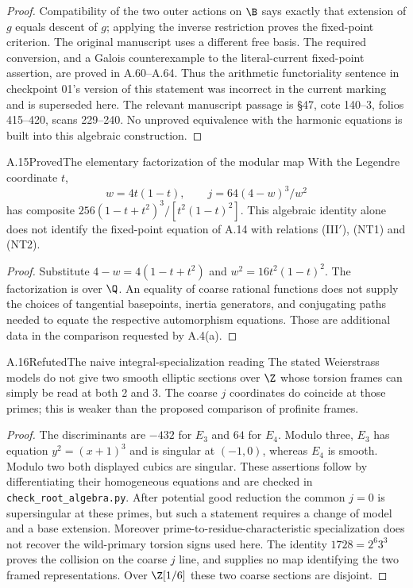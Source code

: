 \begin{proof}
Compatibility of the two outer actions on $\B$ says
exactly that extension of $g$ equals descent of $g$;
applying the inverse restriction proves the fixed-point
criterion. The original manuscript uses a different free basis.
The required conversion, and a Galois counterexample to the
literal-current fixed-point assertion, are proved in A.60--A.64.
Thus the arithmetic functoriality sentence in checkpoint 01's
version of this statement was incorrect in the current marking
and is superseded here. The relevant manuscript passage is
\S47, cote 140--3, folios 415--420, scans 229--240.
No unproved equivalence with the harmonic equations is built
into this algebraic construction.
\end{proof}

\begin{statement}{A.15}{Proved}{The elementary factorization of the modular map}
With the Legendre coordinate $t$,
\[
 w=4t(1-t),\qquad j=64(4-w)^3/w^2
\]
has composite $256(1-t+t^2)^3/[t^2(1-t)^2]$.
This algebraic identity alone does not identify the
fixed-point equation of A.14 with relations (III$'$),
(NT1) and (NT2).
\end{statement}
\begin{proof}
Substitute $4-w=4(1-t+t^2)$ and
$w^2=16t^2(1-t)^2$. The factorization is over $\Q$.
An equality of coarse rational functions does not supply
the choices of tangential basepoints, inertia generators,
and conjugating paths needed to equate the respective
automorphism equations. Those are additional data in
the comparison requested by A.4(a).
\end{proof}

\begin{statement}{A.16}{Refuted}{The naive integral-specialization reading}
The stated Weierstrass models do not give two smooth
elliptic sections over $\Z$ whose torsion frames can simply
be read at both 2 and 3. The coarse $j$ coordinates do
coincide at those primes; this is weaker than the proposed
comparison of profinite frames.
\end{statement}
\begin{proof}
The discriminants are $-432$ for $E_3$ and $64$ for $E_4$.
Modulo three, $E_3$ has equation $y^2=(x+1)^3$ and is
singular at $(-1,0)$, whereas $E_4$ is smooth. Modulo
two both displayed cubics are singular. These assertions
follow by differentiating their homogeneous equations
and are checked in \texttt{check\_root\_algebra.py}.
After potential good reduction the common $j=0$ is
supersingular at these primes, but such a statement
requires a change of model and a base extension.
Moreover prime-to-residue-characteristic specialization
does not recover the wild-primary torsion signs used here.
The identity $1728=2^6 3^3$ proves the collision on the
coarse $j$ line, and supplies no map identifying the
two framed representations. Over $\Z[1/6]$ these two
coarse sections are disjoint.
\end{proof}

